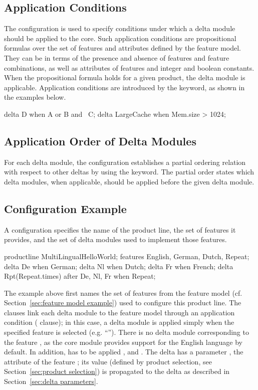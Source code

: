 \subsection{Application Conditions}
\label{sec:application conditions}
The configuration is used to specify conditions under which a delta module
should be applied to the core. Such application conditions are propositional
formulas over the set of features and attributes defined by the feature model.
They can be in terms of the presence and absence of features and feature
combinations, as well as attributes of features and integer and boolean
constants. When the propositional formula holds for a given product, the delta
module is applicable. Application conditions are introduced by the 
keyword, as shown in the examples below.
\begin{absexample}
delta D when A or B and ~C;
delta LargeCache when Mem.size > 1024;
\end{absexample}

\subsection{Application Order of Delta Modules}
\label{sec:delta ordering}
For each delta module, the configuration establishes a partial ordering relation
with respect to other deltas by using the  keyword. The partial
order states which delta modules, when applicable, should be applied before the
given delta module.


\subsection{Configuration Example}
A configuration specifies the name of the product line, the set of
features it provides, and the set of delta modules used to implement those
features.

\begin{absexample}
productline MultiLingualHelloWorld;
    features English, German, Dutch, Repeat;
    delta De when German;
    delta Nl when Dutch;
    delta Fr when French;
    delta Rpt(Repeat.times) after De, Nl, Fr when Repeat;
\end{absexample}

The example above first names the set of features from the feature model (cf.
Section~\ref{sec:feature model example}) used to configure this product line.
The  clauses link each delta module to the feature model
through an application condition ( clause); in this case, a
delta module is applied simply when the specified feature is selected (e.g.
``''). There is no delta module corresponding to the
feature , as the core module provides support for the English
language by default. In addition,  has to be applied
 ,  and .
The  delta has a parameter , the
 attribute of the feature ; its value
(defined by product selection, see Section~\ref{sec:product selection}) is
propagated to the  delta as described in Section~\ref{sec:delta parameters}.


